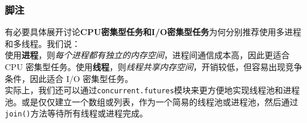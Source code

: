\subsubsection{脚注}

有必要具体展开讨论\textbf{CPU密集型任务和I/O密集型任务}为何分别推荐使用多进程和多线程。我们说：\\

使用\textbf{进程}，则\textit{每个进程都有独立的内存空间}，进程间通信成本高，因此更适合 CPU 密集型任务。使用\textbf{线程}，则\textit{线程共享内存空间}，开销较低，但容易出现竞争条件，因此适合 I/O 密集型任务。\\

实际上，我们还可以通过\texttt{concurrent.futures}模块来更方便地实现线程池和进程池。或是仅仅建立一个数组或列表，作为一个简易的线程池或进程池，然后通过\texttt{join()}方法等待所有线程或进程完成。